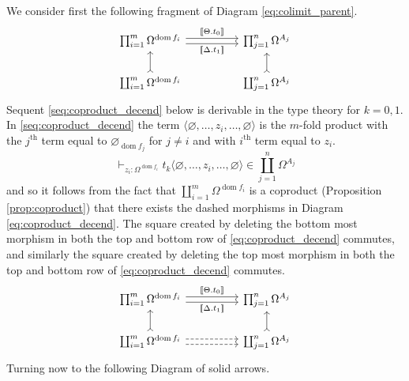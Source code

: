 \documentclass{tac}
\begin{document}
	We consider first the following fragment of Diagram \eqref{eq:colimit_parent}.
	\begin{equation}\label{eq:coproduct_parent}
		\begin{tikzcd}[column sep = huge]
			\prod_{i = 1}^m \Omega^{\operatorname{dom}f_i}\arrow[r,shift left, "{\llbracket\Theta.  t_0 \rrbracket}"]\arrow[r,swap,shift right,"{\llbracket \Delta. t_1\rrbracket}"] & \prod_{j = 1}^n\Omega^{A_j}\\
			\coprod_{i = 1}^m \Omega^{\operatorname{dom}f_i}\arrow[u,rightarrowtail] & \coprod_{j = 1}^n \Omega^{A_j}\arrow[u,rightarrowtail]
		\end{tikzcd}
	\end{equation}
	Sequent \eqref{seq:coproduct_decend} below is derivable in the type theory for $k = 0,1$. In \eqref{seq:coproduct_decend} the term $\langle \varnothing, \hdots, z_i, \hdots, \varnothing \rangle$ is the $m$-fold product with the $j^{\text{th}}$ term equal to $\varnothing_{\operatorname{dom}f_j}$ for $j \neq i$ and with $i^{\text{th}}$ term equal to $z_i$.
	\begin{equation}\label{seq:coproduct_decend}
		\vdash_{z_i : \Omega^{\operatorname{dom}f_i}} t_k\langle \varnothing, \hdots, z_i, \hdots, \varnothing \rangle \in \coprod_{j = 1}^n \Omega^{A_j}
	\end{equation}
	and so it follows from the fact that $\coprod_{i = 1}^m \Omega^{\operatorname{dom}f_i}$ is a coproduct (Proposition \ref{prop:coproduct}) that there exists the dashed morphisms in Diagram \eqref{eq:coproduct_decend}. The square created by deleting the bottom most morphism in both the top and bottom row of \eqref{eq:coproduct_decend} commutes, and similarly the square created by deleting the top most morphism in both the top and bottom row of \eqref{eq:coproduct_decend} commutes.
	\begin{equation}\label{eq:coproduct_decend}
		\begin{tikzcd}[column sep = huge]
			\prod_{i = 1}^m \Omega^{\operatorname{dom}f_i}\arrow[r,shift left, "{\llbracket\Theta.  t_0 \rrbracket}"]\arrow[r,swap,shift right,"{\llbracket \Delta. t_1\rrbracket}"] & \prod_{j = 1}^n\Omega^{A_j}\\
			\coprod_{i = 1}^m \Omega^{\operatorname{dom}f_i}\arrow[u,rightarrowtail]\arrow[r,dashed, shift left]\arrow[r,dashed, shift right] & \coprod_{j = 1}^n \Omega^{A_j}\arrow[u,rightarrowtail]
		\end{tikzcd}
	\end{equation}
	Turning now to the following Diagram of solid arrows.
\end{document}
